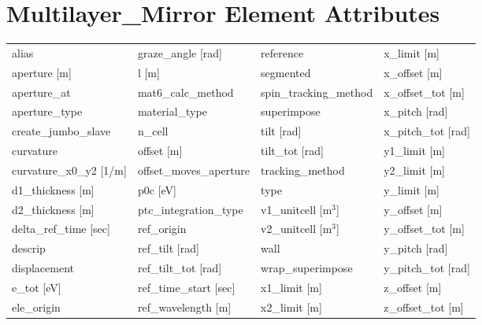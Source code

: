  \section{Multilayer_Mirror Element Attributes}
 \label{s:list.multilayer.mirror}
 
 \begin{tabular}{llll} \toprule
alias                            & graze_angle [rad]                & reference                        & x_limit [m]                      \\
aperture [m]                     & l [m]                            & segmented                        & x_offset [m]                     \\
aperture_at                      & mat6_calc_method                 & spin_tracking_method             & x_offset_tot [m]                 \\
aperture_type                    & material_type                    & superimpose                      & x_pitch [rad]                    \\
create_jumbo_slave               & n_cell                           & tilt [rad]                       & x_pitch_tot [rad]                \\
curvature                        & offset [m]                       & tilt_tot [rad]                   & y1_limit [m]                     \\
curvature_x0_y2 [1/m]            & offset_moves_aperture            & tracking_method                  & y2_limit [m]                     \\
d1_thickness [m]                 & p0c [eV]                         & type                             & y_limit [m]                      \\
d2_thickness [m]                 & ptc_integration_type             & v1_unitcell [m$^3$]              & y_offset [m]                     \\
delta_ref_time [sec]             & ref_origin                       & v2_unitcell [m$^3$]              & y_offset_tot [m]                 \\
descrip                          & ref_tilt [rad]                   & wall                             & y_pitch [rad]                    \\
displacement                     & ref_tilt_tot [rad]               & wrap_superimpose                 & y_pitch_tot [rad]                \\
e_tot [eV]                       & ref_time_start [sec]             & x1_limit [m]                     & z_offset [m]                     \\
ele_origin                       & ref_wavelength [m]               & x2_limit [m]                     & z_offset_tot [m]                 \\
 \bottomrule
 \end{tabular}
 \vfill
 
